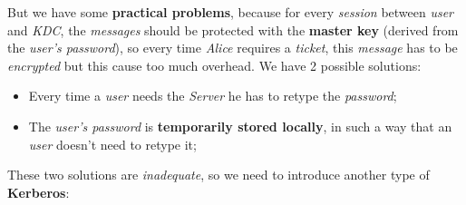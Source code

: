 \documentclass{article}
\begin{document}
But we have some \textbf{practical problems}, because for every \emph{session} between \emph{user} and \emph{KDC}, the \emph{messages} should be protected with the \textbf{master key} (derived from the \emph{user's password}), so every time \emph{Alice} requires a \emph{ticket}, this \emph{message} has to be \emph{encrypted} but this cause too much overhead. We have 2 possible solutions:
\begin{itemize}
\item Every time a \emph{user} needs the \emph{Server} he has to retype the \emph{password};
\item The \emph{user's password} is \textbf{temporarily stored locally}, in such a way that an \emph{user} doesn't need to retype it;
\end{itemize}
These two solutions are \emph{inadequate}, so we need to introduce another type of \textbf{Kerberos}:
\end{document}
